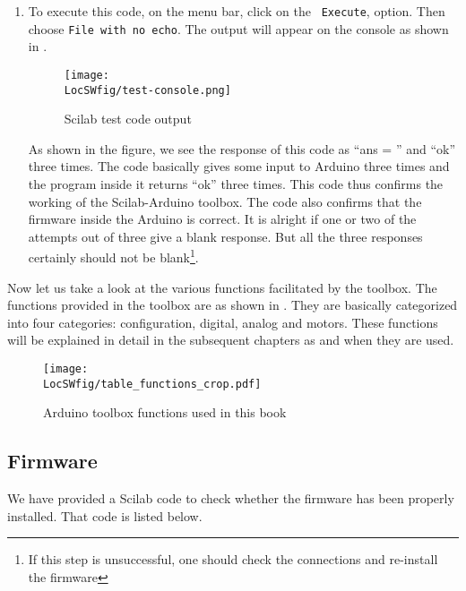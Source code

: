 \begin{enumerate}
      \item To execute this code, on the menu bar, click on the {\tt
                        Execute}, option. Then choose {\tt File with no echo}. The output
            will appear on the console as shown in .
            \begin{figure}
                  \centering
                  \texttt{[image: \\LocSWfig/test-console.png]}
                  \caption{Scilab test code output}
                  \label{test-console}
            \end{figure}
            As shown in the figure, we see the response of this code as ``ans = '' and
            ``ok'' three times.  The
            code basically gives some input to Arduino three times and the
            program inside it returns ``ok'' three times.  This code thus confirms
            the working of the Scilab-Arduino toolbox.  The code also confirms
            that the firmware inside the Arduino is correct.  It is alright if
            one or two of the attempts out of three give a blank response.  But
            all the three responses certainly should not be
            blank\footnote{\label{fn:firmware}If this step is unsuccessful,
                  one should check the connections and re-install the firmware}.
\end{enumerate}

Now let us take a look at the various functions facilitated by the
toolbox. The functions provided in the toolbox are as shown in 
. They are basically categorized into four categories:
configuration, digital, analog and motors. These functions will be
explained in detail in the subsequent chapters as and when they are
used.

\begin{figure}
      \centering
      \texttt{[image: \\LocSWfig/table\_functions\_crop.pdf]}
      \caption{Arduino toolbox functions used in this book}
      \label{func}
\end{figure}

\subsection{Firmware}
\lstset{style=mystyle}
\label{sec:test-firmware-scilab}
We have provided a Scilab code to check whether the firmware has been
properly installed.  That code is listed below.

\begin{scicode}
      \label{sci:test-firmware}
      
\end{scicode}


